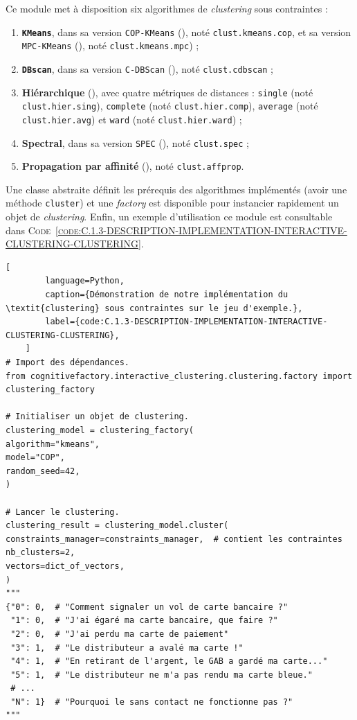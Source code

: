 	Ce module met à disposition six algorithmes de \textit{clustering} sous contraintes :
	\begin{enumerate}
		\item \textbf{\texttt{KMeans}}, dans sa version \texttt{COP-KMeans} (\cite{wagstaff-etal:2001:constrained-kmeans-clustering}), noté \texttt{clust.kmeans.cop}, et sa version \texttt{MPC-KMeans} (\cite{khan-etal:2012:multiple-parameter-based}), noté \texttt{clust.kmeans.mpc}) ;
		\item \textbf{\texttt{DBscan}}, dans sa version \texttt{C-DBScan} (\cite{ruiz-etal:2010:densitybased-semisupervised-clustering}), noté \texttt{clust.cdbscan} ;
		\item \textbf{Hiérarchique} (\cite{davidson-ravi:2005:agglomerative-hierarchical-clustering}), avec quatre métriques de distances : \texttt{single} (noté \texttt{clust.hier.sing}), \texttt{complete} (noté \texttt{clust.hier.comp}), \texttt{average} (noté \texttt{clust.hier.avg}) et \texttt{ward} (noté \texttt{clust.hier.ward}) ;
		\item \textbf{Spectral}, dans sa version \texttt{SPEC} (\cite{kamvar-etal:2003:spectral-learning}), noté \texttt{clust.spec} ;
		\item \textbf{Propagation par affinité} (\cite{givoni-frey:2009:semisupervised-affinity-propagation}), noté \texttt{clust.affprop}.
	\end{enumerate}
	
	Une classe abstraite définit les prérequis des algorithmes implémentés (avoir une méthode \texttt{cluster}) et une \textit{factory} est disponible pour instancier rapidement un objet de \textit{clustering}.
	Enfin, un exemple d'utilisation ce module est consultable dans \textsc{Code~\ref{code:C.1.3-DESCRIPTION-IMPLEMENTATION-INTERACTIVE-CLUSTERING-CLUSTERING}}.
	
	
	\begin{lstlisting}[
		language=Python,
		caption={Démonstration de notre implémentation du \textit{clustering} sous contraintes sur le jeu d'exemple.},
		label={code:C.1.3-DESCRIPTION-IMPLEMENTATION-INTERACTIVE-CLUSTERING-CLUSTERING},
	]
# Import des dépendances.
from cognitivefactory.interactive_clustering.clustering.factory import clustering_factory

# Initialiser un objet de clustering.
clustering_model = clustering_factory(
algorithm="kmeans",
model="COP",
random_seed=42,
)

# Lancer le clustering.
clustering_result = clustering_model.cluster(
constraints_manager=constraints_manager,  # contient les contraintes
nb_clusters=2,
vectors=dict_of_vectors,
)
"""
{"0": 0,  # "Comment signaler un vol de carte bancaire ?"
 "1": 0,  # "J'ai égaré ma carte bancaire, que faire ?"
 "2": 0,  # "J'ai perdu ma carte de paiement"
 "3": 1,  # "Le distributeur a avalé ma carte !"
 "4": 1,  # "En retirant de l'argent, le GAB a gardé ma carte..."
 "5": 1,  # "Le distributeur ne m'a pas rendu ma carte bleue."
 # ...
 "N": 1}  # "Pourquoi le sans contact ne fonctionne pas ?"
"""
	\end{lstlisting}
	
